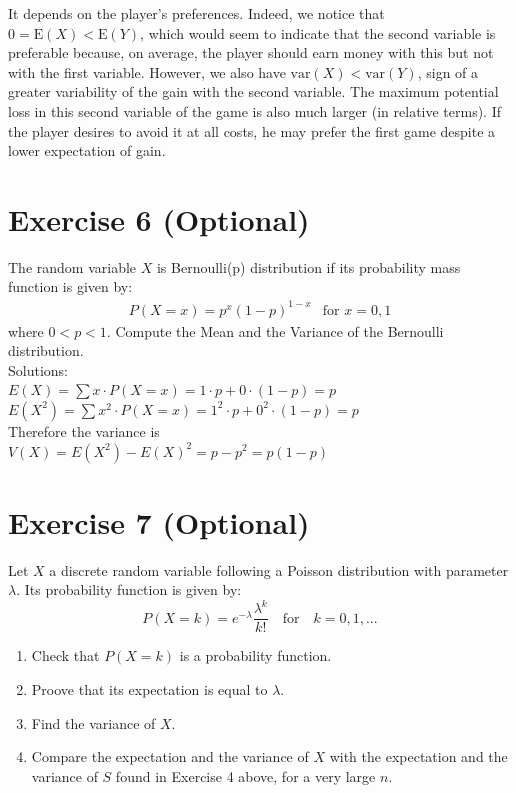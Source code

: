 \documentclass[12pt,thmsa]{article}
\begin{document}
\begin{enumerate}
It depends on the player's preferences. Indeed, we notice that $ 0 = \mbox {E} (X) <\mbox {E} (Y) $, which would seem to indicate that the second variable is preferable because, on average, the player should earn money with this but not with the first variable. However, we also have $ \mbox {var} (X) <\mbox {var} (Y) $, sign of a greater variability of the gain with the second variable. The maximum potential loss in this second variable of the game is also much larger (in relative terms). If the player desires to avoid it at all costs, he may prefer the first game despite a lower expectation of gain.

\end{enumerate}


\section*{Exercise 6 (Optional)}
The random variable $ X $ is Bernoulli(p) distribution if its probability mass function is given by:
\begin{align*}
P(X=x)=p^{x}(1-p)^{1-x} & \text{for } x=0,1
\end{align*}
where $ 0<p<1 $.
Compute the Mean and the Variance of the Bernoulli distribution.\\

\noindent Solutions:\\
\noindent $ E(X)= \sum x\cdot P(X=x)=1\cdot p+0\cdot (1-p)=p $\\
$ E(X^{2})=\sum x^{2}\cdot P(X=x)=1^{2}\cdot p+0^{2}\cdot (1-p)=p $\\
Therefore the variance is \\
$ V(X)=E(X^{2})-E(X)^{2}=p-p^{2}=p(1-p) $\\






\section*{Exercise 7 (Optional)}

Let $X$ a discrete random variable following a Poisson distribution with parameter $\lambda$. Its probability function is given by:
\begin{equation*}
P(X=k)=e^{-\lambda} \frac{\lambda^{k}}{k!} \quad \text{for} \quad k=0,1,...
\end{equation*}
\begin{enumerate}
  \item Check that $P(X=k)$ is a probability function.
  \item Proove that its expectation is equal to $\lambda$.
  \item Find the variance of $X$.
  \item Compare the expectation and the variance of $X$ with the expectation and the variance of $S$ found in Exercise 4 above, for a very large $n$.
\end{enumerate}
\end{document}
